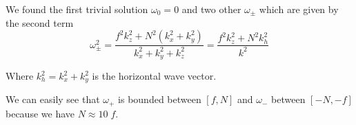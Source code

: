 We found the first trivial solution $\omega_0 = 0$ and two other $\omega_\pm$ which are given by the second term
\begin{equation}
	\omega_\pm^2 = \frac{f^2 k_z^2 + N^2 \left( k_x^2 + k_y^2 \right)}{k_x^2 + k_y^2 + k_z^2} = \frac{f^2 k_z^2 + N^2 k_h^2}{k^2}
\end{equation}

Where $k_h^2 = k_x^2 + k_y^2$ is the horizontal wave vector.


We can easily see that $\omega_+$ is bounded between $\left[ f, N \right]$ and $\omega_-$ between $\left[ -N, -f \right]$ because we have $N \approx 10 \; f$.





